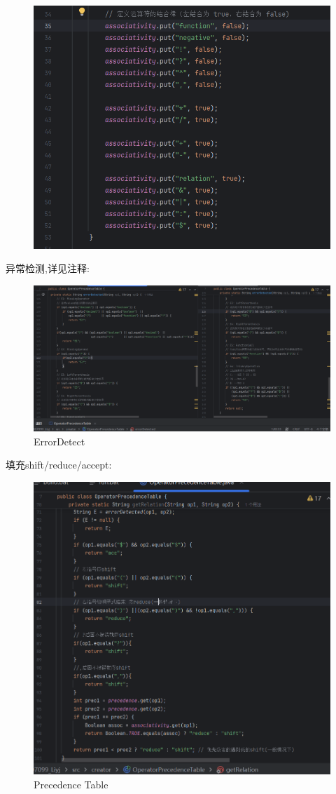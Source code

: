\documentclass{article}
\begin{document}
\begin{figure}[H]
    \centering
    \includegraphics[width=\linewidth]{P2.png}
    \caption{}
    \label{fig:P2}
\end{figure}
异常检测,详见注释:
\begin{figure}[H]
    \centering
    \includegraphics[width=\linewidth]{ErrorDetect.png}
    \caption{ErrorDetect}
    \label{fig:ErrorDetect}
\end{figure}
填充shift/reduce/accept:
\begin{figure}[H]
    \centering
    \includegraphics[width=0.8\linewidth]{Precedence.png}
    \caption{Precedence Table}
    \label{fig:Precedence}
\end{figure}
\end{document}
